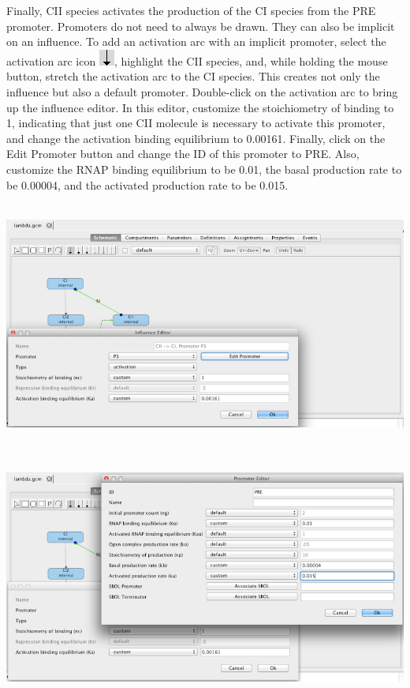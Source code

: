 \documentclass[titlepage,11pt]{article}
\begin{document}
Finally, CII species activates the production of the CI species from the PRE promoter.  Promoters do not need to always be drawn.  They can also be implicit on an influence.  To add an activation arc with an implicit promoter, select the activation arc icon \includegraphics{../gui/icons/modelview/activation_selected}, highlight the CII species, and, while holding the mouse button, stretch the activation arc to the CI species.  This creates not only the influence but also a default promoter.  Double-click on the activation arc to bring up the influence editor.  In this editor, customize the stoichiometry of binding to 1, indicating that just one CII molecule is necessary to activate this promoter, and change the activation binding equilibrium to 0.00161.  Finally, click on the Edit Promoter button and change the ID of this promoter to PRE.  Also, customize the RNAP binding equilibrium to be 0.01, the basal production rate to be 0.00004, and the activated production rate to be 0.015.

\begin{center}
\includegraphics[height=80mm]{screenshots/activation}
\end{center}

\begin{center}
\includegraphics[height=80mm]{screenshots/activated_promoter}
\end{center}
\end{document}
